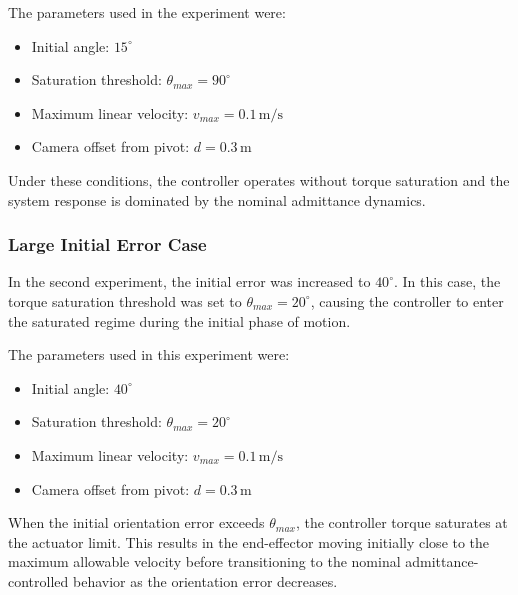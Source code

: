 \documentclass[journal]{IEEEtran}
\begin{document}
The parameters used in the experiment were:

\begin{itemize}
\item Initial angle: $15^\circ$
\item Saturation threshold: $\theta_{max} = 90^\circ$
\item Maximum linear velocity: $v_{max} = 0.1\,\mathrm{m/s}$
\item Camera offset from pivot: $d = 0.3\,\mathrm{m}$
\end{itemize}

Under these conditions, the controller operates without torque saturation and the system response is dominated by the nominal admittance dynamics.

\subsubsection{Large Initial Error Case}

In the second experiment, the initial error was increased to $40^\circ$. In this case, the torque saturation threshold was set to $\theta_{max} = 20^\circ$, causing the controller to enter the saturated regime during the initial phase of motion.

The parameters used in this experiment were:

\begin{itemize}
\item Initial angle: $40^\circ$
\item Saturation threshold: $\theta_{max} = 20^\circ$
\item Maximum linear velocity: $v_{max} = 0.1\,\mathrm{m/s}$
\item Camera offset from pivot: $d = 0.3\,\mathrm{m}$
\end{itemize}

When the initial orientation error exceeds $\theta_{max}$, the controller torque saturates at the actuator limit. This results in the end-effector moving initially close to the maximum allowable velocity before transitioning to the nominal admittance-controlled behavior as the orientation error decreases.

\end{document}
